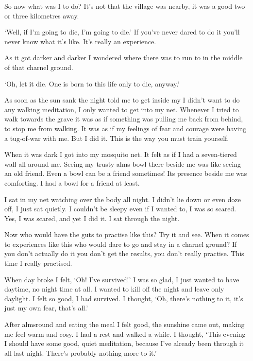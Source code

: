 So now what was I to do? It's not that the village was nearby, it was a good two or three kilometres away. 

`Well, if I'm going to die, I'm going to die.' If you've never dared to do it you'll never know what it's like. It's really an experience. 

As it got darker and darker I wondered where there was to run to in the middle of that charnel ground. 

`Oh, let it die. One is born to this life only to die, anyway.' 

As soon as the sun sank the night told me to get inside my \textit{} I didn't want to do any walking meditation, I only wanted to get into my net. Whenever I tried to walk towards the grave it was as if something was pulling me back from behind, to stop me from walking. It was as if my feelings of fear and courage were having a tug-of-war with me. But I did it. This is the way you must train yourself. 

When it was dark I got into my mosquito net. It felt as if I had a seven-tiered wall all around me. Seeing my trusty alms bowl there beside me was like seeing an old friend. Even a bowl can be a friend sometimes! Its presence beside me was comforting. I had a bowl for a friend at least. 

I sat in my net watching over the body all night. I didn't lie down or even doze off, I just sat quietly. I couldn't be sleepy even if I wanted to, I was so scared. Yes, I was scared, and yet I did it. I sat through the night. 

Now who would have the guts to practise like this? Try it and see. When it comes to experiences like this who would dare to go and stay in a charnel ground? If you don't actually do it you don't get the results, you don't really practise. This time I really practised. 

When day broke I felt, `Oh! I've survived!' I was so glad, I just wanted to have daytime, no night time at all. I wanted to kill off the night and leave only daylight. I felt so good, I had survived. I thought, `Oh, there's nothing to it, it's just my own fear, that's all.' 

After almsround and eating the meal I felt good, the sunshine came out, making me feel warm and cosy. I had a rest and walked a while. I thought, `This evening I should have some good, quiet meditation, because I've already been through it all last night. There's probably nothing more to it.' 

